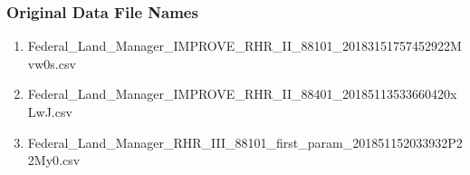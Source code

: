 








\subsubsection*{Original Data File Names}

\begin{enumerate}[noitemsep]
\item Federal\_Land\_Manager\_IMPROVE\_RHR\_II\_88101\_20183151757452922Mvw0s.csv %
\item Federal\_Land\_Manager\_IMPROVE\_RHR\_II\_88401\_20185113533660420xLwJ.csv  %
\item  Federal\_Land\_Manager\_RHR\_III\_88101\_first\_param\_201851152033932P22My0.csv  %


\end{enumerate}


